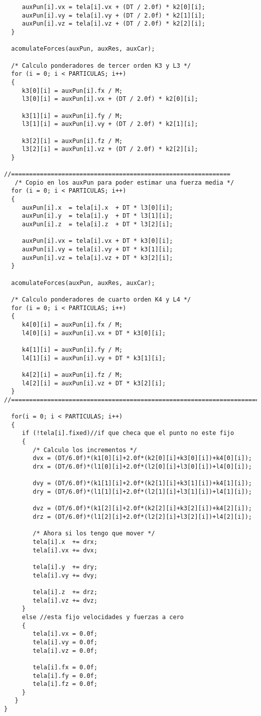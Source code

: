 \begin{verbatim}
     auxPun[i].vx = tela[i].vx + (DT / 2.0f) * k2[0][i];
     auxPun[i].vy = tela[i].vy + (DT / 2.0f) * k2[1][i];
     auxPun[i].vz = tela[i].vz + (DT / 2.0f) * k2[2][i];
  }

  acomulateForces(auxPun, auxRes, auxCar);

  /* Calculo ponderadores de tercer orden K3 y L3 */
  for (i = 0; i < PARTICULAS; i++)
  {
     k3[0][i] = auxPun[i].fx / M;
     l3[0][i] = auxPun[i].vx + (DT / 2.0f) * k2[0][i];

     k3[1][i] = auxPun[i].fy / M;
     l3[1][i] = auxPun[i].vy + (DT / 2.0f) * k2[1][i];

     k3[2][i] = auxPun[i].fz / M;
     l3[2][i] = auxPun[i].vz + (DT / 2.0f) * k2[2][i];
  }

//=============================================================
   /* Copio en los auxPun para poder estimar una fuerza media */
  for (i = 0; i < PARTICULAS; i++)
  {
     auxPun[i].x  = tela[i].x  + DT * l3[0][i];
     auxPun[i].y  = tela[i].y  + DT * l3[1][i];
     auxPun[i].z  = tela[i].z  + DT * l3[2][i];

     auxPun[i].vx = tela[i].vx + DT * k3[0][i];
     auxPun[i].vy = tela[i].vy + DT * k3[1][i];
     auxPun[i].vz = tela[i].vz + DT * k3[2][i];
  }

  acomulateForces(auxPun, auxRes, auxCar);

  /* Calculo ponderadores de cuarto orden K4 y L4 */
  for (i = 0; i < PARTICULAS; i++)
  {
     k4[0][i] = auxPun[i].fx / M;
     l4[0][i] = auxPun[i].vx + DT * k3[0][i];

     k4[1][i] = auxPun[i].fy / M;
     l4[1][i] = auxPun[i].vy + DT * k3[1][i];

     k4[2][i] = auxPun[i].fz / M;
     l4[2][i] = auxPun[i].vz + DT * k3[2][i];
  }
//=======================================================================

  for(i = 0; i < PARTICULAS; i++)
  {
     if (!tela[i].fixed)//if que checa que el punto no este fijo
     {
        /* Calculo los incrementos */
        dvx = (DT/6.0f)*(k1[0][i]+2.0f*(k2[0][i]+k3[0][i])+k4[0][i]);
        drx = (DT/6.0f)*(l1[0][i]+2.0f*(l2[0][i]+l3[0][i])+l4[0][i]);

        dvy = (DT/6.0f)*(k1[1][i]+2.0f*(k2[1][i]+k3[1][i])+k4[1][i]);
        dry = (DT/6.0f)*(l1[1][i]+2.0f*(l2[1][i]+l3[1][i])+l4[1][i]);

        dvz = (DT/6.0f)*(k1[2][i]+2.0f*(k2[2][i]+k3[2][i])+k4[2][i]);
        drz = (DT/6.0f)*(l1[2][i]+2.0f*(l2[2][i]+l3[2][i])+l4[2][i]);

        /* Ahora si los tengo que mover */
        tela[i].x  += drx;
        tela[i].vx += dvx;

        tela[i].y  += dry;
        tela[i].vy += dvy;

        tela[i].z  += drz;
        tela[i].vz += dvz;
     }
     else //esta fijo velocidades y fuerzas a cero
     {
        tela[i].vx = 0.0f;
        tela[i].vy = 0.0f;
        tela[i].vz = 0.0f;

        tela[i].fx = 0.0f;
        tela[i].fy = 0.0f;
        tela[i].fz = 0.0f;
     }
   }
}
\end{verbatim}
